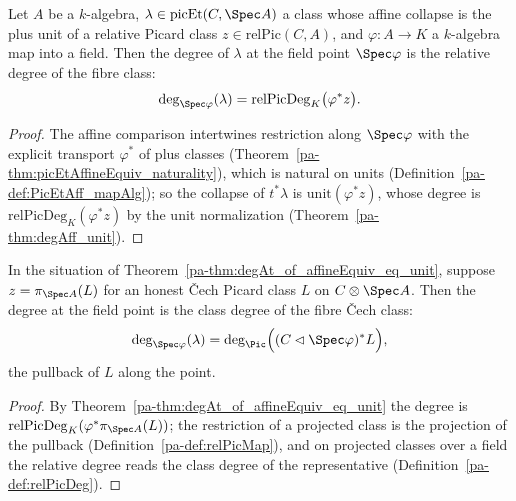 \begin{theorem}
  \label{pa-thm:degAt_of_affineEquiv_eq_unit}
  \leanok

  Let \(A\) be a \(k\)-algebra, \(\lambda \in \mathrm{picEt}(C, \Spec A)\) a class whose
  affine collapse is the plus unit of a relative Picard class \(z \in \mathrm{relPic}(C,A)\),
  and \(\varphi \colon A \to K\) a \(k\)-algebra map into a field. Then the degree of
  \(\lambda\) at the field point \(\Spec \varphi\) is the relative degree of the fibre class:
  \[
    \deg_{\Spec\varphi}(\lambda) = \mathrm{relPicDeg}_K\bigl(\varphi^{*} z\bigr).
  \]
\end{theorem}
\begin{proof}
  \leanok
  The affine comparison intertwines restriction along \(\Spec\varphi\) with the explicit
  transport \(\varphi^{*}\) of plus classes (Theorem~\ref{pa-thm:picEtAffineEquiv_naturality}),
  which is natural on units (Definition~\ref{pa-def:PicEtAff_mapAlg}); so the collapse of
  \(t^{*}\lambda\) is \(\mathrm{unit}(\varphi^{*} z)\), whose degree is
  \(\mathrm{relPicDeg}_K(\varphi^{*} z)\) by the unit normalization
  (Theorem~\ref{pa-thm:degAff_unit}).
\end{proof}

\begin{theorem}
  \label{pa-thm:degAt_of_affineEquiv_eq_unit_relPicMk}
  \leanok

  In the situation of Theorem~\ref{pa-thm:degAt_of_affineEquiv_eq_unit}, suppose
  \(z = \pi_{\Spec A}(L)\) for an honest \v Cech Picard class \(L\) on \(C \otimes \Spec A\).
  Then the degree at the field point is the class degree of the fibre \v Cech class:
  \[
    \deg_{\Spec\varphi}(\lambda)
      = \deg_{\Pic}\Bigl( (C \lhd \Spec\varphi)^{*} L \Bigr),
  \]
  the pullback of \(L\) along the point.
\end{theorem}
\begin{proof}
  \leanok
  By Theorem~\ref{pa-thm:degAt_of_affineEquiv_eq_unit} the degree is
  \(\mathrm{relPicDeg}_K(\varphi^{*}\pi_{\Spec A}(L))\); the restriction of a projected class
  is the projection of the pullback (Definition~\ref{pa-def:relPicMap}), and on projected
  classes over a field the relative degree reads the class degree of the representative
  (Definition~\ref{pa-def:relPicDeg}).
\end{proof}

